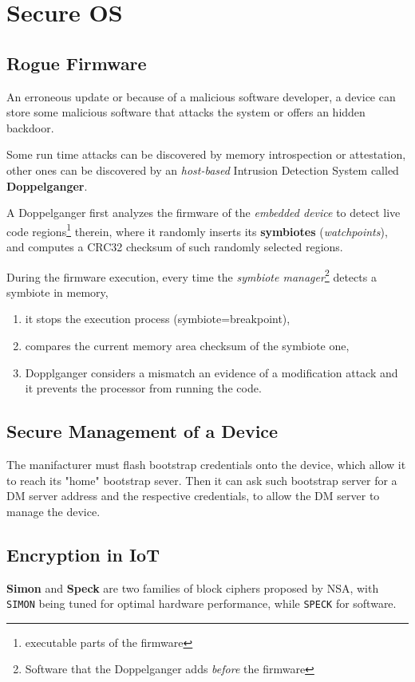 \chapter{Secure OS}

\section{Rogue Firmware}
An erroneous update or because of a malicious software developer, a device can store some malicious software that attacks the
system or offers an hidden backdoor.

Some run time attacks can be discovered by memory introspection or
attestation, other ones can be discovered by an \textit{host-based} Intrusion Detection System called \textbf{Doppelganger}.

A Doppelganger first analyzes the firmware of the \textit{embedded device} to detect
live code regions\footnote{executable parts of the firmware} therein, where it randomly
inserts its \textbf{symbiotes} (\textit{watchpoints}), and computes a CRC32 checksum of such randomly selected regions.

During the firmware execution, every time the \textit{symbiote manager}\footnote{Software that the Doppelganger adds \textit{before} the firmware} detects
a symbiote in memory,
\begin{enumerate}
   \item it stops the execution process (symbiote=breakpoint),
   \item compares the current memory area checksum of the symbiote one,
   \item Dopplganger considers a mismatch an evidence of a modification
   attack and it prevents the processor from running the code.
\end{enumerate}


\section{Secure Management of a Device}
The manifacturer must flash bootstrap credentials onto the device,
which allow it to reach its "home" bootstrap sever.
Then it can ask such bootstrap server for a DM server address and the respective credentials,
to allow the DM server to manage the device.

\section{Encryption in IoT}
\textbf{Simon} and \textbf{Speck} are two families of block ciphers proposed by NSA,
with \texttt{SIMON} being tuned for optimal hardware performance, while \texttt{SPECK} for software.

